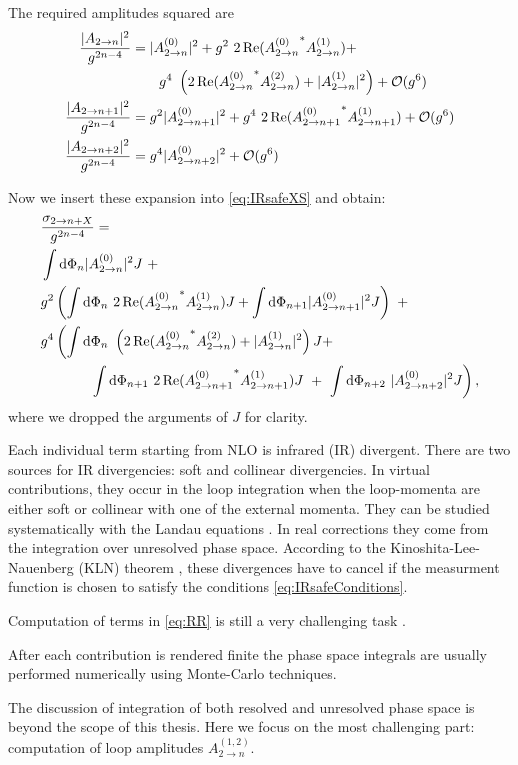 The required amplitudes squared are
\begin{subequations}
  \begin{align}
    \frac{\vert A_{2\to n} \vert^2}{g^{2n-4}}  &= \vert A^{(0)}_{2\to n} \vert^2 + g^2~2\Re({A^{(0)}_{2\to n}}^{*} A^{(1)}_{2\to n}) + \\ & \qquad g^4~\left(2\Re({A^{(0)}_{2\to n}}^{*} A^{(2)}_{2\to n}) + \vert A^{(1)}_{2\to n} \vert^2 \right)+ \mathcal{O}(g^{6})  \\
    \frac{\vert A_{2\to n+1} \vert^2}{g^{2n-4}} &= g^2 \vert A^{(0)}_{2\to n+1} \vert^2 + g^4~2\Re({A^{(0)}_{2\to n+1}}^{*} A^{(1)}_{2\to n+1}) + \mathcal{O}(g^{6}) \\
    \frac{\vert A_{2\to n+2} \vert^2}{g^{2n-4}} &= g^4 \vert A^{(0)}_{2\to n+2} \vert^2 + \mathcal{O}(g^{6})
  \end{align}
\end{subequations}

Now we insert these expansion into \eqref{eq:IRsafeXS} and obtain:
\begin{subequations}
  \label{eq:NNLO_xs}
  \begin{align}
    \nonumber
    & \frac{\sigma_{2\rightarrow n + X}}{g^{2n-4}} = \\
    & \int \dd\Phi_n \vert A^{(0)}_{2\to n} \vert^2 J  ~+ \\
    & g^{2} \left( \int \dd\Phi_n~2\Re({A^{(0)}_{2\to n}}^{*} A^{(1)}_{2\to n}) J  + \int \dd\Phi_{n+1} \vert A^{(0)}_{2\to n+1} \vert^2 J \right) ~+ \\
    & g^{4} \left( \int \dd\Phi_n~ \left( 2\Re({A^{(0)}_{2\to n}}^{*} A^{(2)}_{2\to n}) + \vert A^{(1)}_{2\to n} \vert^2 \right) J   + \right. \\ 
    \label{eq:RR}
    & \hspace{8ex} \left. \int \dd\Phi_{n+1}~ 2\Re({A^{(0)}_{2\to n+1}}^{*} A^{(1)}_{2\to n+1}) J ~+~ \int \dd\Phi_{n+2}~ \vert A^{(0)}_{2\to n+2} \vert^2 J \right),
  \end{align}
\end{subequations}
where we dropped the arguments of $J$ for clarity. 

Each individual term starting from NLO is infrared (IR) divergent.
There are two sources for IR divergencies: soft and collinear divergencies.
In virtual contributions, they occur in the loop integration when the loop-momenta are
either soft or collinear with one of the external momenta.
They can be studied systematically with the Landau equations \cite{Landau1959}.
In real corrections they come from the integration over unresolved phase space.
According to the Kinoshita-Lee-Nauenberg (KLN) theorem \cite{Kinoshita1962,Lee1964},
these divergences have to cancel if the measurment function is chosen to satisfy the conditions \eqref{eq:IRsafeConditions}.

Computation of terms in \eqref{eq:RR} is still a very challenging task .

After each contribution is rendered finite the phase space integrals are usually performed numerically using Monte-Carlo techniques.

The discussion of integration of both resolved and unresolved phase space is beyond the scope of this thesis.
Here we focus on the most challenging part:
computation of loop amplitudes $A^{(1,2)}_{2\to n}$.

